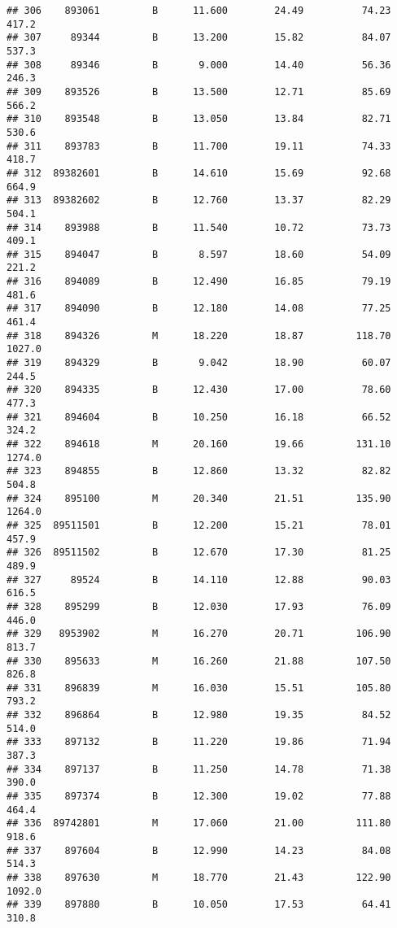 \documentclass[
]{article}
\begin{document}
\begin{verbatim}
## 306    893061         B      11.600        24.49          74.23     417.2
## 307     89344         B      13.200        15.82          84.07     537.3
## 308     89346         B       9.000        14.40          56.36     246.3
## 309    893526         B      13.500        12.71          85.69     566.2
## 310    893548         B      13.050        13.84          82.71     530.6
## 311    893783         B      11.700        19.11          74.33     418.7
## 312  89382601         B      14.610        15.69          92.68     664.9
## 313  89382602         B      12.760        13.37          82.29     504.1
## 314    893988         B      11.540        10.72          73.73     409.1
## 315    894047         B       8.597        18.60          54.09     221.2
## 316    894089         B      12.490        16.85          79.19     481.6
## 317    894090         B      12.180        14.08          77.25     461.4
## 318    894326         M      18.220        18.87         118.70    1027.0
## 319    894329         B       9.042        18.90          60.07     244.5
## 320    894335         B      12.430        17.00          78.60     477.3
## 321    894604         B      10.250        16.18          66.52     324.2
## 322    894618         M      20.160        19.66         131.10    1274.0
## 323    894855         B      12.860        13.32          82.82     504.8
## 324    895100         M      20.340        21.51         135.90    1264.0
## 325  89511501         B      12.200        15.21          78.01     457.9
## 326  89511502         B      12.670        17.30          81.25     489.9
## 327     89524         B      14.110        12.88          90.03     616.5
## 328    895299         B      12.030        17.93          76.09     446.0
## 329   8953902         M      16.270        20.71         106.90     813.7
## 330    895633         M      16.260        21.88         107.50     826.8
## 331    896839         M      16.030        15.51         105.80     793.2
## 332    896864         B      12.980        19.35          84.52     514.0
## 333    897132         B      11.220        19.86          71.94     387.3
## 334    897137         B      11.250        14.78          71.38     390.0
## 335    897374         B      12.300        19.02          77.88     464.4
## 336  89742801         M      17.060        21.00         111.80     918.6
## 337    897604         B      12.990        14.23          84.08     514.3
## 338    897630         M      18.770        21.43         122.90    1092.0
## 339    897880         B      10.050        17.53          64.41     310.8

\end{verbatim}
\end{document}
